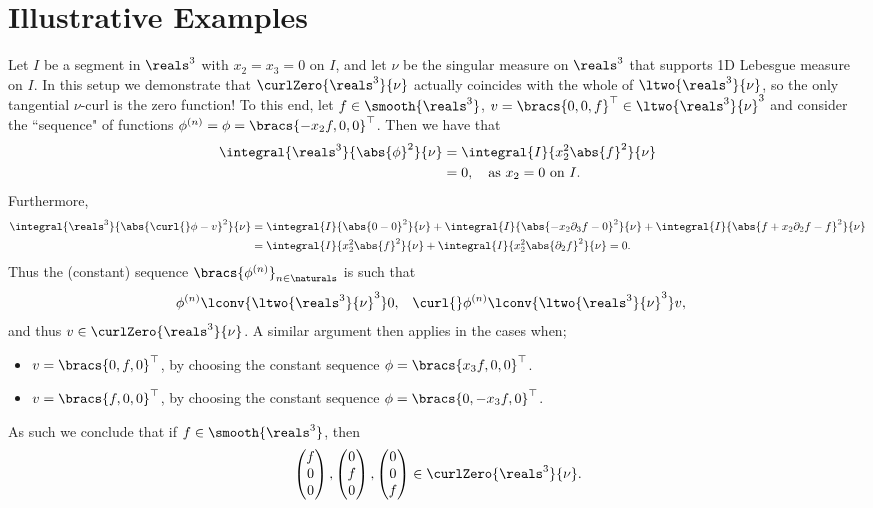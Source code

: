 \section{Illustrative Examples} \label{sec:CurlExamples}
Let $I$ be a segment in $\reals^3$ with $x_2=x_3=0$ on $I$, and let $\nu$ be the singular measure on $\reals^3$ that supports 1D Lebesgue measure on $I$.
In this setup we demonstrate that $\curlZero{\reals^3}{\nu}$ actually coincides with the whole of $\ltwo{\reals^3}{\nu}$, so the only tangential $\nu$-curl is the zero function!
To this end, let $f\in\smooth{\reals^3}$, $v=\bracs{0,0,f}^\top\in\ltwo{\reals^3}{\nu}^3$ and consider the ``sequence" of functions $\phi^{(n)}=\phi=\bracs{-x_2 f, 0, 0}^\top$.
Then we have that
\begin{align*}
	\integral{\reals^3}{\abs{\phi}^2}{\nu} &= \integral{I}{x_2^2\abs{f}^2}{\nu} \\
	&= 0, \quad \text{as } x_2=0 \text{ on } I.
\end{align*}
Furthermore,
\begin{align*}
	\integral{\reals^3}{\abs{\curl{}\phi - v}^2}{\nu} &= \integral{I}{\abs{0-0}^2}{\nu} + \integral{I}{\abs{-x_2\partial_3 f - 0}^2}{\nu} + \integral{I}{\abs{f + x_2\partial_2 f - f}^2}{\nu} \\
	&= \integral{I}{x_2^2\abs{f}^2}{\nu} + \integral{I}{x_2^2\abs{\partial_2 f}^2}{\nu}
	= 0.
\end{align*}
Thus the (constant) sequence $\bracs{\phi^{(n)}}_{n\in\naturals}$ is such that
\begin{align*}
	\phi^{(n)} \lconv{\ltwo{\reals^3}{\nu}^3} 0, &\quad \curl{}\phi^{(n)} \lconv{\ltwo{\reals^3}{\nu}^3} v,
\end{align*}
and thus $v\in\curlZero{\reals^3}{\nu}$.
A similar argument then applies in the cases when;
\begin{itemize}
	\item $v=\bracs{0, f, 0}^\top$, by choosing the constant sequence $\phi = \bracs{x_3 f, 0, 0}^\top$.
	\item $v=\bracs{f, 0, 0}^\top$, by choosing the constant sequence $\phi = \bracs{0, -x_3 f, 0}^\top$.
\end{itemize}
As such we conclude that if $f\in\smooth{\reals^3}$, then
\begin{align*}
	\begin{pmatrix}	f \\ 0 \\ 0	\end{pmatrix},
	\begin{pmatrix}	0 \\ f \\ 0	\end{pmatrix},
	\begin{pmatrix}	0 \\ 0 \\ f	\end{pmatrix}
	\in \curlZero{\reals^3}{\nu}.
\end{align*}
